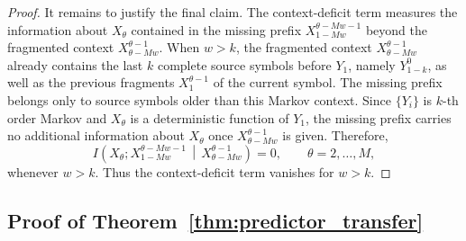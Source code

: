 \documentclass{article}
\theoremstyle{plain}
\theoremstyle{definition}
\theoremstyle{remark}
\begin{document}
\begin{proof}
    It remains to justify the final claim. The context-deficit term measures the
    information about \(X_\theta\) contained in the missing prefix
    \(X_{1-Mw}^{\theta-Mw-1}\) beyond the fragmented context
    \(X_{\theta-Mw}^{\theta-1}\). When \(w>k\), the fragmented context
    \(X_{\theta-Mw}^{\theta-1}\) already contains the last \(k\) complete source
    symbols before \(Y_1\), namely \(Y_{1-k}^{0}\), as well as the previous
    fragments \(X_1^{\theta-1}\) of the current symbol. The missing prefix belongs
    only to source symbols older than this Markov context. Since \(\{Y_i\}\) is
    \(k\)-th order Markov and \(X_\theta\) is a deterministic function of \(Y_1\),
    the missing prefix carries no additional information about \(X_\theta\) once
    \(X_{\theta-Mw}^{\theta-1}\) is given. Therefore,
    \[
        I\!\left(
            X_{\theta};
            X_{1-Mw}^{\theta-Mw - 1}
            \,\middle|\,
            X_{\theta-Mw}^{\theta-1}
        \right)
        =
        0,
        \qquad \theta=2,\ldots,M,
    \]
    whenever \(w>k\). Thus the context-deficit term vanishes for \(w>k\).
    \end{proof}
    
    
    \newpage
    \subsection{Proof of Theorem~\ref{thm:predictor_transfer}}
    \label{proof:predictor-transfer}
    
\end{document}
